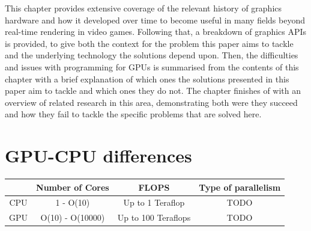 \documentclass[a4paper,12pt,twoside,openright]{report}
\begin{document}
This chapter provides extensive coverage of the relevant history of graphics
hardware and how it developed over time to become useful in many fields beyond
real-time rendering in video games. Following that, a breakdown of graphics
APIs is provided, to give both the context for the problem this paper aims to
tackle and the underlying technology the solutions depend upon. Then, the
difficulties and issues with programming for GPUs is summarised from the
contents of this chapter with a brief explanation of which ones the solutions
presented in this paper aim to tackle and which ones they do not. The chapter
finishes of with an overview of related research in this area, demonstrating
both were they succeed and how they fail to tackle the specific problems that
are solved here.


\section{GPU-CPU differences}



\begin{center}
\begin{tabular}{||c||c|c|c||}
\hline
        & Number of Cores  & FLOPS                                         & Type of parallelism \\
\hline
\hline
CPU     & 1 - O(10)        & Up to 1 Teraflop \cite{IntelTeraFlop}         & TODO                \\
\hline
GPU     & O(10) - O(10000) & Up to 100 Teraflops \cite{NVIDIA100TeraFlops} & TODO                \\
\hline
\end{tabular}
\end{center}

\end{document}
